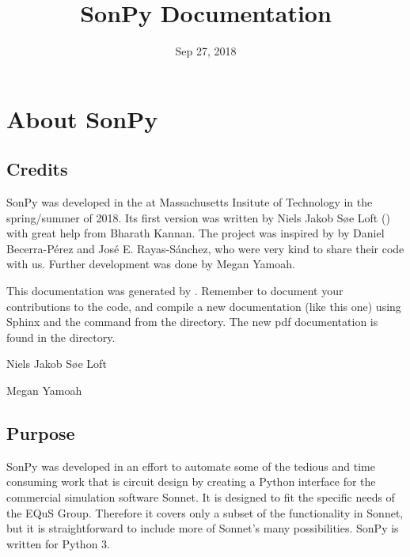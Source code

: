 \documentclass[letterpaper,10pt,english,openany]{sphinxmanual}
\title{SonPy Documentation}
\date{Sep 27, 2018}
\author{}
\begin{document}
\maketitle
\sphinxtableofcontents
{}\label{\detokenize{index::doc}}



\chapter{About SonPy}
\label{\detokenize{source/about:about-sonpy}}\label{\detokenize{source/about::doc}}

\section{Credits}
\label{\detokenize{source/about:credits}}
SonPy was developed in the  at Massachusetts Insitute of Technology in the spring/summer of 2018. Its first version was written by Niels Jakob Søe Loft () with great help from Bharath Kannan. The project was inspired by  by Daniel Becerra-Pérez and José E. Rayas-Sánchez, who were very kind to share their code with us. Further development was done by Megan Yamoah.

This documentation was generated by . Remember to document your contributions to the code, and compile a new documentation (like this one) using Sphinx and the command  from the  directory. The new pdf documentation is found in the  directory.

 Niels Jakob Søe Loft

 Megan Yamoah


\section{Purpose}
\label{\detokenize{source/about:purpose}}
SonPy was developed in an effort to automate some of the tedious and time consuming work that is circuit design by creating a Python interface for the commercial simulation software Sonnet. It is designed to fit the specific needs of the EQuS Group. Therefore it covers only a subset of the functionality in Sonnet, but it is straightforward to include more of Sonnet’s many possibilities. SonPy is written for Python 3.
\end{document}
